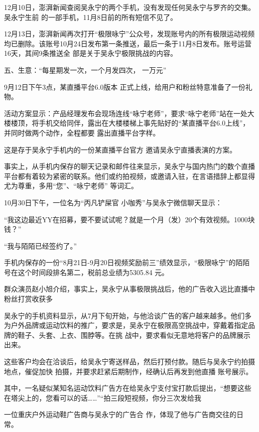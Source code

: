 \documentclass{article}
\begin{document}
12月10日，澎湃新闻查阅吴永宁的两个手机，没有发现任何吴永宁与罗齐的交集。吴永宁生前
的一部手机，11月8日前的所有短信不见了。 

12月13日，澎湃新闻再次打开“极限咏宁”公众号，发现账号内的所有极限运动视频均已删除。该账号10月24日发布第一条推送，最后一条于11月8日发布。账号运营16天，其间9条推送全
部是关于吴永宁极限挑战的内容。 

五、生意：“每星期发一次，一个月发四次，
一万元” 

\newpage

9月12日下午3点，某直播平台6.0版本
正式上线，给用户和粉丝特意准备了一份礼物。 

活动方案显示：产品经理发布会现场连线“咏宁老师”，要求“咏宁老师”站在一处大楼楼顶，将手机交给同伴，露出在大楼楼梯上事先贴好的“某直播平台6.0上线”，并同时做两个动作，全程都要
露出直播平台字样。 

这是存于吴永宁手机内的一份某直播平台官方
邀请吴永宁直播表演的方案。 

事实上，从手机内保存的聊天记录和邮件往来显示，吴永宁与国内热门的数个直播平台都有着较为紧密的联系。他们或约拍视频，或邀请入驻，在言语措辞上都显得尤为尊重，多用“您”、“咏宁老师”
等词汇。 

10月30日下午，一位名为“丙凡铲屎官 
小咖秀”与吴永宁微信聊天显示： 

\newpage

“我这边最近YY在招募，要不要试试呢？就是一个月（发）20个有效视频。1000块钱？”


“我与陌陌已经签约了。” 

手机内保存的一份“8月21日-9月20日视频奖励前三”绩效显示，“极限咏宁”的陌陌号在这个时间段排名第二，税前总业绩为5305.84
元。 

群众演员赵小旭介绍，事实上，吴永宁从事极限挑战后，他的广告收入远比直播中粉丝打赏收获多

吴永宁的手机资料显示，从7月下旬开始，与他洽谈广告的客户越来越多。他们多为户外品牌或运动饮料的推广，要求是，吴永宁在极限高空挑战中，穿戴着指定品牌的鞋子、头套、上衣、围脖等。在挑
战中，要求看似无意地将客户的品牌展示出来。 

这些客户均会在洽谈后，给吴永宁寄送样品，然后打预付款。随后与吴永宁约拍摄地点，催促加快
\newpage
拍摄，并要求赶紧后期制作，经确认后再发到他直播
账号展示。 

其中，一名疑似某知名运动饮料广告方在给吴永宁支付宝打款后提出，“想要这些在塔尖上的，您看可以的话……”“拍三段短视频，你分三次发给我

一位重庆户外运动鞋广告商与吴永宁的广告合
作，体现了他与广告商交往的日常。 
\end{document}
